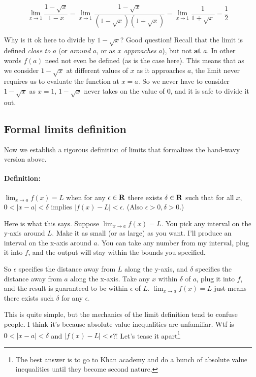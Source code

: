 \[\lim_{x\to 1}\frac{1-\sqrt{x}}{1-x}=\lim_{x\to 1}\frac{1-\sqrt{x}}{(1-\sqrt{x})(1+\sqrt{x})}=\lim_{x\to 1}\frac{1}{1+\sqrt{x}}=\frac{1}{2}\]

\vs

Why is it ok here to divide by $1-\sqrt{x}$? Good question! Recall
that the limit is defined \textit{close to} $a$ (or \textit{around}
$a$, or as $x$ \textit{approaches} $a$), but not \textbf{at} $a$. In
other words $f(a)$ need not even be defined (as is the case here).
This means that as we consider $1-\sqrt{x}$ at different values of $x$
as it approaches $a$, the limit never requires us to evaluate the
function at $x=a$. So we never have to consider $1-\sqrt{x}$ as $x=1$,
$1-\sqrt{x}$ never takes on the value of $0$, and it is safe to divide
it out.

\subsection{Formal limits definition}

Now we establish a rigorous definition of limits that formalizes the
hand-wavy version above.

\paragraph{Definition:} $\lim_{x\to a}f(x)=L$ when for any
$\epsilon\in\mathbf{R}$ there exists $\delta\in\mathbf{R}$ such that for all $x$,
$0<|x-a|<\delta$ implies $|f(x)-L|<\epsilon$. (Also $\epsilon>0, \delta>0$.)

\vs

Here is what this says. Suppose $\lim_{x\to a}f(x)=L$. You pick any
interval on the y-axis around $L$. Make it as small (or as large) as
you want. I'll produce an interval on the x-axis around $a$. You can
take any number from my interval, plug it into $f$, and the output
will stay within the bounds you specified.

\vs

So $\epsilon$ specifies the distance away from $L$ along the y-axis, and
$\delta$ specifies the distance away from $a$ along the x-axis. Take any
$x$ within $\delta$ of $a$, plug it into $f$, and the result is guaranteed
to be within $\epsilon$ of $L$. $\lim_{x\to a}f(x)=L$ just means there exists
such $\delta$ for any $\epsilon$.

\vs

This is quite simple, but the mechanics of the limit definition tend
to confuse people. I think it's because absolute value inequalities
are unfamiliar. Wtf is $0<|x-a|<\delta$ and $|f(x)-L|<\epsilon$?! Let's tease it
apart\footnote{The best answer is to go to Khan academy and do a bunch
  of absolute value inequalities until they become second nature.}

